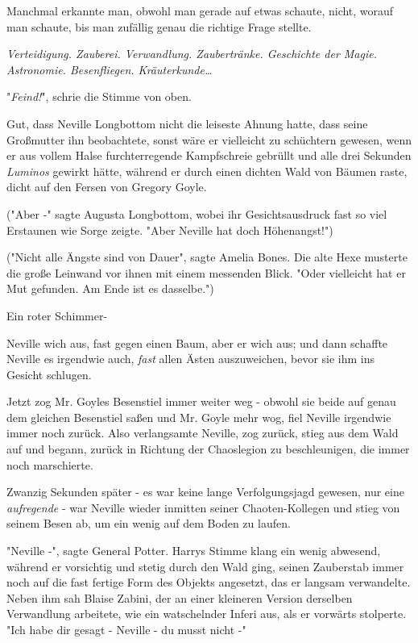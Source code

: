 {Manchmal erkannte man, obwohl man gerade auf etwas schaute, nicht, worauf man schaute, bis man zufällig genau die richtige Frage stellte.

\emph{Verteidigung. Zauberei. Verwandlung. Zaubertränke. Geschichte der Magie. Astronomie. Besenfliegen. Kräuterkunde…}

"\emph{Feind!}", schrie die Stimme von oben.

Gut, dass Neville Longbottom nicht die leiseste Ahnung hatte, dass seine Großmutter ihn beobachtete, sonst wäre er vielleicht zu schüchtern gewesen, wenn er aus vollem Halse furchterregende Kampfschreie gebrüllt und alle drei Sekunden \emph{Luminos} gewirkt hätte, während er durch einen dichten Wald von Bäumen raste, dicht auf den Fersen von Gregory Goyle.

("Aber -" sagte Augusta Longbottom, wobei ihr Gesichtsausdruck fast so viel Erstaunen wie Sorge zeigte. "Aber Neville hat doch Höhenangst!")

("Nicht alle Ängste sind von Dauer", sagte Amelia Bones. Die alte Hexe musterte die große Leinwand vor ihnen mit einem messenden Blick. "Oder vielleicht hat er Mut gefunden. Am Ende ist es dasselbe.")

Ein roter Schimmer-

Neville wich aus, fast gegen einen Baum, aber er wich aus; und dann schaffte Neville es irgendwie auch, \emph{fast} allen Ästen auszuweichen, bevor sie ihm ins Gesicht schlugen.

Jetzt zog Mr. Goyles Besenstiel immer weiter weg - obwohl sie beide auf genau dem gleichen Besenstiel saßen und Mr. Goyle mehr wog, fiel Neville irgendwie immer noch zurück. Also verlangsamte Neville, zog zurück, stieg aus dem Wald auf und begann, zurück in Richtung der Chaoslegion zu beschleunigen, die immer noch marschierte.

Zwanzig Sekunden später - es war keine lange Verfolgungsjagd gewesen, nur eine \emph{aufregende} - war Neville wieder inmitten seiner Chaoten-Kollegen und stieg von seinem Besen ab, um ein wenig auf dem Boden zu laufen.

"Neville -", sagte General Potter. Harrys Stimme klang ein wenig abwesend, während er vorsichtig und stetig durch den Wald ging, seinen Zauberstab immer noch auf die fast fertige Form des Objekts angesetzt, das er langsam verwandelte. Neben ihm sah Blaise Zabini, der an einer kleineren Version derselben Verwandlung arbeitete, wie ein watschelnder Inferi aus, als er vorwärts stolperte. "Ich habe dir gesagt - Neville - du musst nicht -"

}
